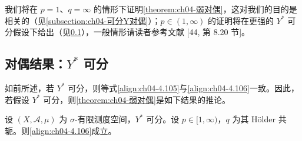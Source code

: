 \documentclass[../../main.tex]{subfiles}%
\begin{document}
我们将在 $p=1$、$q=\infty$ 的情形下证明\cref{theorem:ch04-弱对偶}，这对我们的目的是相关的（见\cref{subsection:ch04-可分Y对偶}）；$p\in(1,\infty)$ 的证明将在更强的 $Y^*$ 可分假设下给出（见\cref{subsection:ch04-可分对偶对偶}），一般情形请读者参考文献 [44, 第 8.20 节]。

\subsection{对偶结果：$Y^*$ 可分}\label{subsection:ch04-可分对偶对偶}

如前所述，若 $Y^*$ 可分，则等式\eqref{align:ch04-4.105}与\eqref{align:ch04-4.106}一致。因此，若假设 $Y^*$ 可分，则\cref{theorem:ch04-弱对偶}是如下结果的推论。

\begin{theorem}\label{theorem:ch04-可分对偶Lp对偶}
设 $(X,\mathcal{A},\mu)$ 为 $\sigma$-有限测度空间，$Y^*$ 可分。设 $p\in[1,\infty)$，$q$ 为其 Hölder 共轭。则\eqref{align:ch04-4.106}成立。
\end{theorem}
\end{document}

